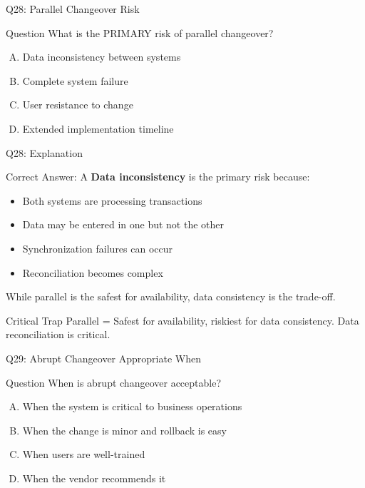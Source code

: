 \documentclass{beamer}
\begin{document}
	\begin{frame}{Q28: Parallel Changeover Risk}
		\begin{block}{Question}
			What is the PRIMARY risk of parallel changeover?
		\end{block}
		\begin{enumerate}[(A)]
			\item Data inconsistency between systems
			\item Complete system failure
			\item User resistance to change
			\item Extended implementation timeline
		\end{enumerate}
	\end{frame}
	
	\begin{frame}{Q28: Explanation}
		\begin{block}{Correct Answer: A}
			\textbf{Data inconsistency} is the primary risk because:
			\begin{itemize}
				\item Both systems are processing transactions
				\item Data may be entered in one but not the other
				\item Synchronization failures can occur
				\item Reconciliation becomes complex
			\end{itemize}
			While parallel is the safest for availability, data consistency is the trade-off.
		\end{block}
		\begin{alertblock}{Critical Trap}
			Parallel = Safest for availability, riskiest for data consistency.
			Data reconciliation is critical.
		\end{alertblock}
	\end{frame}
	
	\begin{frame}{Q29: Abrupt Changeover Appropriate When}
		\begin{block}{Question}
			When is abrupt changeover acceptable?
		\end{block}
		\begin{enumerate}[(A)]
			\item When the system is critical to business operations
			\item When the change is minor and rollback is easy
			\item When users are well-trained
			\item When the vendor recommends it
		\end{enumerate}
	\end{frame}
	
\end{document}

